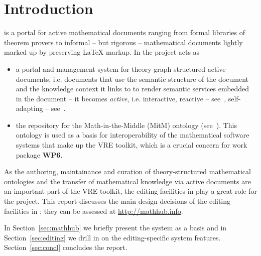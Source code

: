 \section{Introduction}\label{sec:intro}

\sys is a portal for active mathematical documents ranging from formal libraries of
theorem provers to informal -- but rigorous -- mathematical documents lightly marked up by
preserving {\LaTeX} markup. In the \pn project \sys acts as 
\begin{itemize}
\item a portal and management system for theory-graph structured active documents,
  i.e. documents that use the semantic structure of the document and the knowledge context
  it links to to render semantic services embedded in the document -- it becomes
  \emph{active}, i.e. interactive, reactive -- see~\cite{ODK-D4.3}, self-adapting --
  see~\cite{ODK-D4.2}.
\item the repository for the Math-in-the-Middle (MitM) ontology
  (see~\cite{DehKohKon:iop16,ODK-D6.2}). This ontology is used as a basis for
  interoperability of the mathematical software systems that make up the \pn VRE toolkit,
  which is a crucial concern for work package \textbf{WP6}.
\end{itemize}
As the authoring, maintainance and curation of theory-structured mathematical ontologies
and the transfer of mathematical knowledge via active documents are an important part of
the \pn VRE toolkit, the editing facilities in \sys play a great role for the
project. This report discusses the main design decisions of the editing facilities in
\sys; they can be assessed at \url{http://mathhub.info}.

In Section~\ref{sec:mathhub} we briefly present the \sys system as a basis and in
Section~\ref{sec:editing} we drill in on the editing-specific system
features. Section~\ref{sec:concl} concludes the report. 


